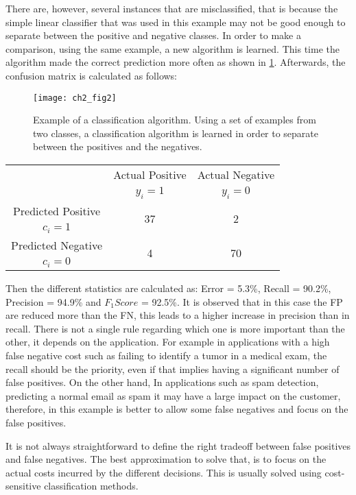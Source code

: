 There are, however, several instances that are misclassified, that is because the simple linear 
classifier that was used in this example may not be good enough to separate between the positive 
and negative classes. In order to make a comparison, using the same example, a new 
algorithm is learned. This time the algorithm made the correct prediction more often as shown in 
\figurename{ \ref{fig:2:3}}. Afterwards, the confusion matrix is calculated as follows:

\begin{figure}[t!]
  \centering
  \texttt{[image: ch2\_fig2]}
  \caption{Example of a classification algorithm. Using a set of examples from two classes, a 
  classification algorithm is learned in order to separate between the positives and the negatives. 
}
  \label{fig:2:3}
\end{figure}

\begin{center}
		\footnotesize
    \begin{tabular}{c|c|c}
			\multicolumn{1}{c|}{}  & Actual Positive& Actual Negative \\
			\multicolumn{1}{c|}{} & $y_i=1$& $y_i=0$ \\
			\hline
			Predicted Positive 		& \multirow{ 2}{*}{37} & \multirow{ 
			2}{*}{2} \\
			$c_i=1$ & &\\
			\hline
			Predicted Negative  	& \multirow{ 2}{*}{4} & \multirow{ 
			2}{*}{70} \\
			$c_i=0$ & &\\
		\end{tabular}
\end{center}
Then the different statistics are calculated as: Error = 5.3\%, Recall = 90.2\%, Precision = 
94.9\% and $F_1Score$ = 92.5\%.
It is observed that in this case the FP are reduced more than the FN, this leads to a higher 
increase in precision  than in recall. There is not a single rule regarding which one is more 
important than the other, it depends on the application. For example in applications with a high 
false negative cost such as failing to identify a tumor in a medical exam, the recall should be the 
priority, even if that implies having a significant number of false positives. On the other hand, 
In applications such as spam detection, predicting a normal email as spam it may have a large 
impact on the customer, therefore, in this example is better to allow some false negatives and 
focus on the false positives.

It is not always straightforward  to define the right tradeoff between false positives 
and false negatives. The best approximation to solve that, is to focus on the actual costs incurred 
by the different decisions. This is usually solved using cost-sensitive classification methods. 

